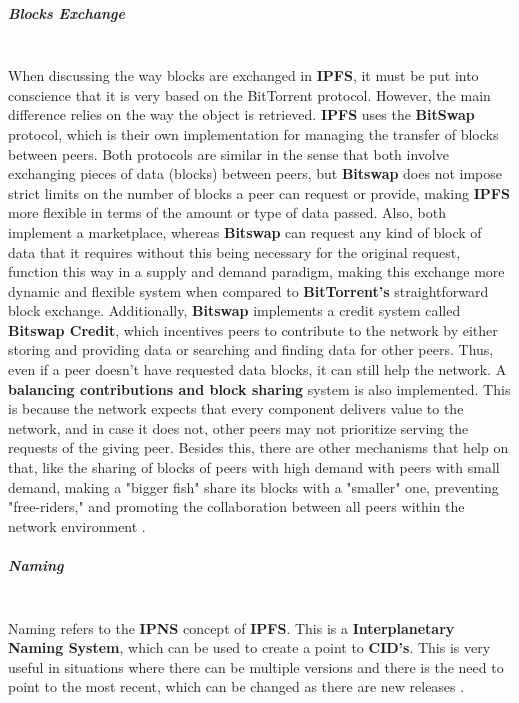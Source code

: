 \subparagraph{Blocks Exchange} \mbox{} \\
When discussing the way blocks are exchanged in \textbf{IPFS}, it must be put into conscience that it is very based on the BitTorrent protocol. However, the main difference relies on the way the object is retrieved. \textbf{IPFS} uses the \textbf{BitSwap} protocol, which is their own implementation for managing the transfer of blocks between peers. Both protocols are similar in the sense that both involve exchanging pieces of data (blocks) between peers, but \textbf{Bitswap} does not impose strict limits on the number of blocks a peer can request or provide, making \textbf{IPFS} more flexible in terms of the amount or type of data passed. Also, both implement a marketplace, whereas \textbf{Bitswap} can request any kind of block of data that it requires without this being necessary for the original request, function this way in a supply and demand paradigm, making this exchange more dynamic and flexible system when compared to \textbf{BitTorrent's} straightforward block exchange. Additionally, \textbf{Bitswap} implements a credit system called \textbf{Bitswap Credit}, which incentives peers to contribute to the network by either storing and providing data or searching and finding data for other peers. Thus, even if a peer doesn't have requested data blocks, it can still help the network. A \textbf{balancing contributions and block sharing} system is also implemented. This is because the network expects that every component delivers value to the network, and in case it does not, other peers may not prioritize serving the requests of the giving peer. Besides this, there are other mechanisms that help on that, like the sharing of blocks of peers with high demand with peers with small demand, making a "bigger fish" share its blocks with a "smaller" one, preventing "free-riders," and promoting the collaboration between all peers within the network environment \cite{bitswap}.

\subparagraph{Naming}  \mbox{} \\
Naming refers to the \textbf{IPNS} concept of \textbf{IPFS}. This is a \textbf{Interplanetary Naming System}, which can be used to create a point to \textbf{CID's}. This is very useful in situations where there can be multiple versions and there is the need to point to the most recent, which can be changed as there are new releases \cite{ipns}.

